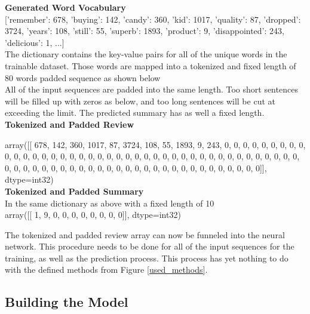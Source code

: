 \begin{tcolorbox}
	
	\textbf{Generated Word Vocabulary} \\
	
	['remember': 678, 'buying': 142, 'candy': 360, 
	'kid': 1017, 'quality': 87, 'dropped': 3724,
	'years': 108, 'still': 55, 'superb': 1893, 
	'product': 9, 'disappointed': 243, 'delicious': 1, ...] \\ 
	
	The dictionary contains the key-value pairs for all of the unique words in the trainable dataset. Those words are mapped into a tokenized and fixed length of 80 words padded sequence as shown below \\
	
	All of the input sequences are padded into the same length. Too short sentences will be filled up with zeros as below, and too long sentences will be cut at exceeding the limit. The predicted summary has as well a fixed length. \\
	
	\textbf{Tokenized and Padded Review}
	
	array([[ 678,  142,  360, 1017,   87, 3724,  108,   55, 1893,    9,  243,
	0,    0,    0,    0,    0,    0,    0,    0,    0,    0,    0,
	0,    0,    0,    0,    0,    0,    0,    0,    0,    0,    0,
	0,    0,    0,    0,    0,    0,    0,    0,    0,    0,    0,
	0,    0,    0,    0,    0,    0,    0,    0,    0,    0,    0,
	0,    0,    0,    0,    0,    0,    0,    0,    0,    0,    0,
	0,    0,    0,    0,    0,    0,    0,    0,    0,    0,    0,
	0,    0,    0]], dtype=int32) \\
	
	
	\textbf{Tokenized and Padded Summary} \\
	In the same dictionary as above with a fixed length of 10\\
	
	array([[ 1, 9, 0,  0,  0,  0,  0,  0,  0,  0]], dtype=int32)
\end{tcolorbox}

The tokenized and padded review array can now be funneled into the neural network. This procedure needs to be done for all of the input sequences for the training, as well as the prediction process. This process has yet nothing to do with the defined methods from Figure \ref{used_methods}.

\subsection{Building the Model}\label{ss:build}

